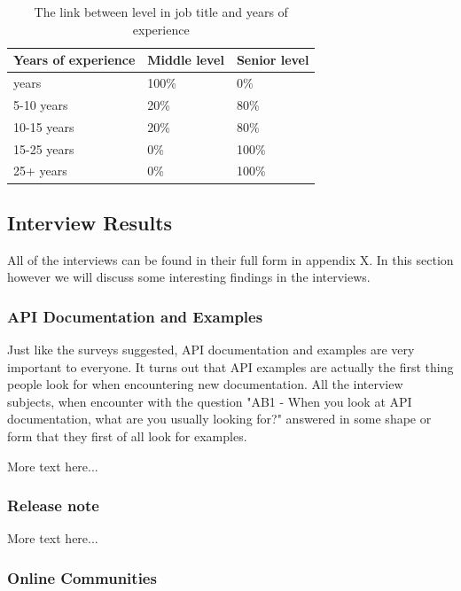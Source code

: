 \documentclass{article}
\begin{document}
\begin{table}[H]
\centering
\begin{tabular}{|l|l|l|}
\hline
\textbf{Years of experience} & \textbf{Middle level} & \textbf{Senior level} \\ \hline
\< 5 years           & 100\%         & 0\%           \\ \hline
5-10 years        & 20\%          & 80\%          \\ \hline
10-15 years       & 20\%          & 80\%          \\ \hline
15-25 years       & 0\%           & 100\%         \\ \hline
25+ years           & 0\%           & 100\%         \\ \hline
\end{tabular}
\caption{The link between level in job title and years of experience}
\label{tab:experience_level}
\end{table}

\subsection{Interview Results}

All of the interviews can be found in their full form in appendix X. In this section however
we will discuss some interesting findings in the interviews.

\subsubsection{API Documentation and Examples}

Just like the surveys suggested, API documentation and examples are very important
to everyone. It turns out that API examples are actually the first thing people
look for when encountering new documentation. All the interview subjects, when
encounter with the question "AB1 - When you look at API documentation, what are you usually looking for?"
answered in some shape or form that they first of all look for examples.

More text here...

\subsubsection{Release note}

More text here...

\subsubsection{Online Communities}
\end{document}
